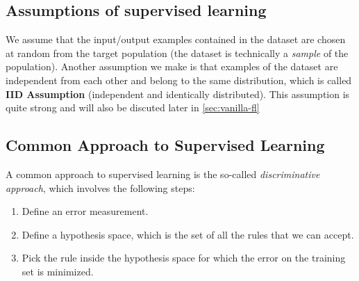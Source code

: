 \subsection{Assumptions of supervised learning} \label{sec:assumptions-supervised-learning}
We assume that the input/output examples contained in the dataset are
chosen at random from
the target population (the dataset is technically a \textit{sample}
of the population).
Another assumption we make is that examples of the dataset are
independent from each other and belong to the same
distribution, which is called \textbf{IID Assumption} (independent
and identically distributed).
This assumption is quite strong and will also be discuted later in
\ref{sec:vanilla-fl}

\subsection{Common Approach to Supervised Learning}
A common approach to supervised learning is the so-called
\textit{discriminative approach}, which involves the following steps:
\begin{enumerate}
  \item Define an error measurement.
  \item Define a hypothesis space, which is the set of all the rules
    that we can accept.
  \item Pick the rule inside the hypothesis space for which the error
    on the training set is minimized.
\end{enumerate}

